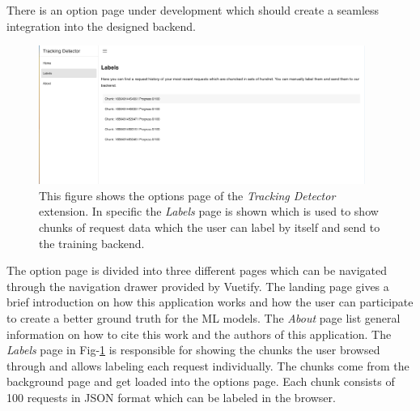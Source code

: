 There is an option page under development which should create a seamless integration into the designed backend.
\begin{figure}
  \begin{center}
    \includegraphics[width=0.95\textwidth]{images/LabelsPage.png}
  \end{center}
  \caption{This figure shows the options page of the \emph{Tracking Detector} extension. In specific the \emph{Labels} page is shown which 
  is used to show chunks of request data which the user can label by itself and send to the training backend.}
  \label{fig:LabelsPage}
\end{figure}
The option page is divided into three different pages which can be navigated through the navigation drawer provided by Vuetify. The landing 
page gives a brief introduction on how this application works and how the user can participate to create a better ground truth for the ML models.
The \emph{About} page list general information on how to cite this work and the authors of this application. The \emph{Labels} page in Fig-\ref{fig:LabelsPage} is responsible
for showing the chunks the user browsed through and allows labeling each request
individually. The chunks come from the background page and get loaded into the options page. Each chunk consists of 100 requests in JSON format 
which can be labeled in the browser. 
